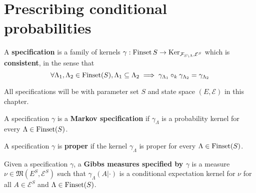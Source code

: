 \section{Prescribing conditional probabilities}

\begin{definition}[Specification]
    \label{def:spec}
    \leanok

    A {\bf specification} is a family of kernels $\gamma : \operatorname{Finset} S \to \operatorname{Ker}_{\mathcal{F}_{S\setminus\Lambda}, \mathcal{E}^S}$ which is {\bf consistent}, in the sense that
    $$\forall \Lambda_1, \Lambda_2 \in \operatorname{Finset}(S), \Lambda_1 \subseteq \Lambda_2 \implies \gamma_{\Lambda_1} \circ_k \gamma_{\Lambda_2} = \gamma_{\Lambda_2}$$
\end{definition}

All specifications will be with parameter set $S$ and state space $(E, \mathcal{E})$ in this chapter.

\begin{definition}
    \label{def:markov-spec}
    \leanok

    A specification $\gamma$ is a \textbf{Markov specification} if $\gamma_\Lambda$ is a probability kernel for every $\Lambda \in \operatorname{Finset}(S)$.
\end{definition}

\begin{definition}
    \label{def:proper-spec}
    \leanok

    A specification $\gamma$ is \textbf{proper} if the kernel $\gamma_\Lambda$ is proper for every $\Lambda \in \operatorname{Finset}(S)$.
\end{definition}

\begin{definition}
    \label{def:gibbs-meas}
    \leanok
    Given a specification $\gamma$, a \textbf{Gibbs measures specified by $\gamma$} is a measure $\nu \in \mathfrak{M}(E^S, \mathcal{E}^S)$ such that $\gamma_\Lambda(A|\cdot)$ is a conditional expectation kernel for $\nu$ for all $A \in \mathcal E^S$ and $\Lambda \in \operatorname{Finset}(S)$.
\end{definition}

